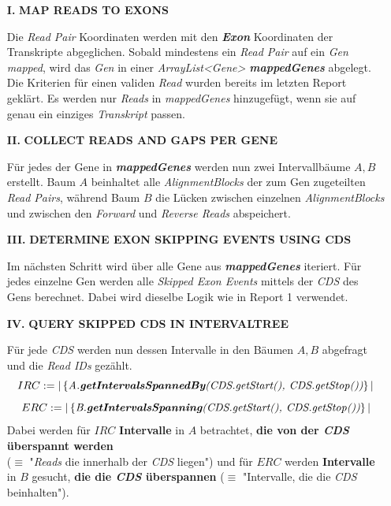 \documentclass[12pt]{article}
\begin{document}
\begin{itemize}
    \item[\textbf{I.}] \textbf{MAP READS TO EXONS}

        Die \textit{Read Pair} Koordinaten werden mit den \textit{\textbf{Exon}} Koordinaten der Transkripte abgeglichen. 
        Sobald mindestens ein \textit{Read Pair} auf ein \textit{Gen} \textit{mapped}, wird das \textit{Gen}
        in einer \textit{ArrayList<Gene> \textbf{mappedGenes}} abgelegt.
        Die Kriterien für einen validen \textit{Read} wurden bereits im letzten Report geklärt. 
        Es werden nur \textit{Reads} in \textit{mappedGenes} hinzugefügt, wenn sie auf genau ein einziges \textit{Transkript}
        passen.

    \item[\textbf{II.}] \textbf{COLLECT READS AND GAPS PER GENE}

        Für jedes der Gene in \textbf{\textit{mappedGenes}} werden nun zwei Intervallbäume $A, B$ erstellt.
        Baum $A$ beinhaltet alle \textit{AlignmentBlocks} der zum Gen zugeteilten \textit{Read Pairs},
        während Baum $B$ die Lücken zwischen einzelnen \textit{AlignmentBlocks} und zwischen
        den \textit{Forward} und \textit{Reverse Reads} abspeichert.

    \item[\textbf{III.}] \textbf{DETERMINE EXON SKIPPING EVENTS USING CDS}

        Im nächsten Schritt wird über alle Gene aus \textbf{\textit{mappedGenes}} iteriert.
        Für jedes einzelne Gen werden alle \textit{Skipped Exon Events} mittels der
        \textit{CDS} des Gens berechnet. Dabei wird dieselbe Logik wie in 
        Report 1 verwendet.

    \item[\textbf{IV.}] \textbf{QUERY SKIPPED CDS IN INTERVALTREE}

        Für jede \textit{CDS} werden nun dessen Intervalle in den Bäumen $A, B$ abgefragt und die
        \textit{Read IDs} gezählt.
        \[
        IRC := |\left\{\textit{A.\textbf{getIntervalsSpannedBy}(CDS.getStart(), CDS.getStop())}\right\}|
        \]
        \[
        ERC := |\left\{\textit{B.\textbf{getIntervalsSpanning}(CDS.getStart(), CDS.getStop())}\right\}|
        \]
        Dabei werden für $IRC$ \textbf{Intervalle} in $A$ betrachtet, \textbf{die von der \textit{CDS} überspannt werden} \\
        ($\equiv$ "\textit{Reads} die innerhalb der \textit{CDS} liegen") und für 
        $ERC$ werden \textbf{Intervalle} in $B$ gesucht, \textbf{die die \textit{CDS} überspannen} 
        ($\equiv$ "Intervalle, die die \textit{CDS} beinhalten").
\end{itemize}
\newpage
\end{document}
